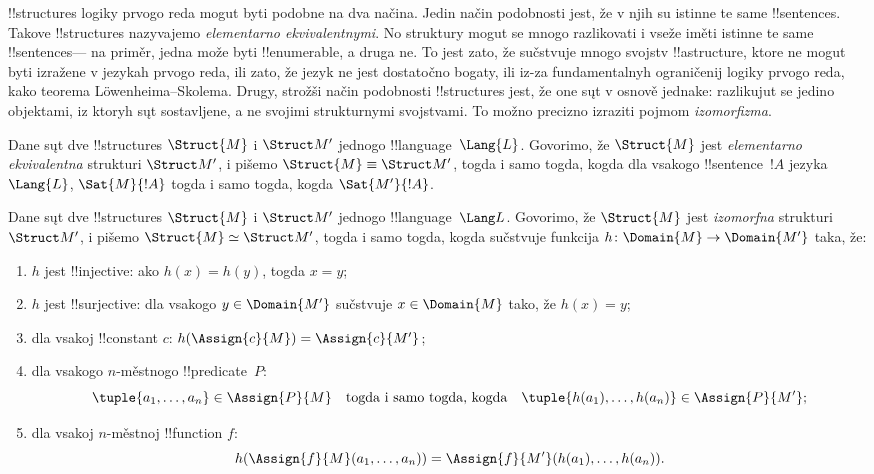 \documentclass[../../../include/open-logic-section]{subfiles}
\begin{document}

!!{structure}s logiky prvogo reda mogut byti podobne na dva načina.
Jedin način podobnosti jest, že v njih su istinne te same
!!{sentence}s. Takove !!{structure}s nazyvajemo
\emph{elementarno ekvivalentnymi}. No struktury mogut se mnogo
razlikovati i vseže iměti istinne te same !!{sentence}s---
na priměr, jedna može byti !!{enumerable}, a druga ne. To jest zato, že
sučstvuje mnogo svojstv !!a{structure}, ktore ne mogut byti izražene
v jezykah prvogo reda, ili zato, že jezyk ne jest dostatočno bogaty,
ili iz-za fundamentalnyh ograničenij logiky prvogo reda, kako teorema
L\"owenheima--Skolema. Drugy, strožši način podobnosti
!!{structure}s jest, že one sųt v osnově jednake: razlikujut se jedino
objektami, iz ktoryh sųt sostavljene, a ne svojimi strukturnymi
svojstvami. To možno precizno izraziti pojmom \emph{izomorfizma}.

\begin{defn}
Dane sųt dve !!{structure}s $\Struct{M}$ i $\Struct M'$ jednogo
!!{language}~$\Lang{L}$. Govorimo, že $\Struct{M}$ jest
\emph{elementarno ekvivalentna} strukturi $\Struct M'$, i pišemo
$\Struct{M} \equiv \Struct M'$, togda i samo togda, kogda dla vsakogo
!!{sentence}~$!A$ jezyka~$\Lang{L}$,
$\Sat{M}{!A}$ togda i samo togda, kogda $\Sat{M'}{!A}$.
\end{defn}

\begin{defn}
 Dane sųt dve !!{structure}s $\Struct{M}$ i
$\Struct M'$ jednogo !!{language}~$\Lang L$. Govorimo, že
$\Struct{M}$ jest \emph{izomorfna} strukturi $\Struct M'$, i pišemo $\Struct{M}
\simeq \Struct M'$, togda i samo togda, kogda sučstvuje funkcija $h
\colon \Domain{M} \to \Domain{M'}$ taka, že:
\begin{enumerate}
\item $h$ jest !!{injective}: ako $h(x) =
  h(y)$, togda $x = y$; 
\item $h$ jest !!{surjective}: dla vsakogo $y \in \Domain{M'}$
  sučstvuje $x \in \Domain{M}$ tako, že $h(x) = y$;
\item {}dla vsakoj !!{constant} $c$:
  $h(\Assign{c}{M}) = \Assign{c}{M'}$;
\item {}dla vsakogo $n$-městnogo !!{predicate}~$P$:
  \[
  \tuple{a_1, \dots, a_n}\in \Assign{P}{M} \quad\text{togda i samo togda, kogda}\quad
  \tuple{h(a_1), \dots, h(a_n)} \in \Assign{P}{M'};
  \]
\item {}dla vsakoj $n$-městnoj !!{function} $f$:
  \[
  h(\Assign{f}{M}(a_1, \dots, a_n)) =
  \Assign{f}{M'}(h(a_1), \dots, h(a_n)).
  \]
\end{enumerate}
\end{defn}
\end{document}
